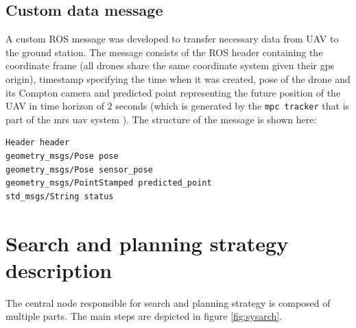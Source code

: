\subsection{Custom data message}
A custom \ac{ROS} message was developed to transfer necessary data from \ac{UAV} to the ground station.
The message consists of the \ac{ROS} header containing the coordinate frame (all drones share the same coordinate system given their gps origin),
timestamp specifying the time when it was created,
pose of the drone and its Compton camera 
and predicted point representing the future position of the \ac{UAV} in time horizon of $2$ seconds (which is generated by the \verb|mpc tracker| that is part of the mrs uav system \cite{mrs_system}).
The structure of the message is shown here:

\begin{lstlisting}[caption={DroneDataMsg.msg (caption)}, title={Custom message for data sharing between \ac{UAV} and central unit.}, label={code1}]
Header header
geometry_msgs/Pose pose
geometry_msgs/Pose sensor_pose
geometry_msgs/PointStamped predicted_point
std_msgs/String status
\end{lstlisting}


\section{Search and planning strategy description}
The central node responsible for search and planning strategy is composed of multiple parts.
The main steps are depicted in figure \ref{fig:sysarch}.

